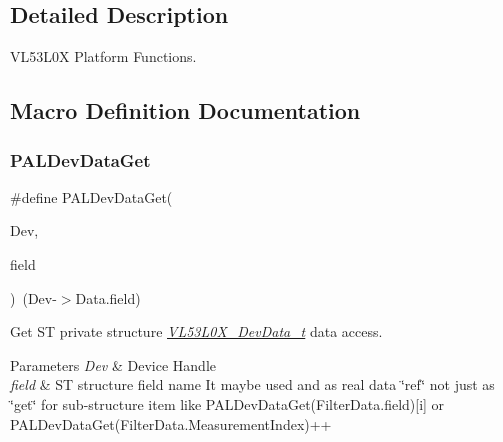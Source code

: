 \subsection{Detailed Description}
V\+L53\+L0X Platform Functions. 



\subsection{Macro Definition Documentation}
\mbox{\label{group__VL53L0X__platform__group_ga21f3ef1fbe84f5cf77d989c95f21ad0a}} 
\subsubsection{\texorpdfstring{P\+A\+L\+Dev\+Data\+Get}{PALDevDataGet}}
{\footnotesize\ttfamily \#define P\+A\+L\+Dev\+Data\+Get(\begin{DoxyParamCaption}\item[{}]{Dev,  }\item[{}]{field }\end{DoxyParamCaption})~(Dev-\/$>$Data.\+field)}



Get ST private structure {\itshape \hyperlink{structVL53L0X__DevData__t}{V\+L53\+L0\+X\+\_\+\+Dev\+Data\+\_\+t}} data access. 


\begin{DoxyParams}{Parameters}
{\em Dev} & Device Handle \\
\hline
{\em field} & ST structure field name It maybe used and as real data \char`\"{}ref\char`\"{} not just as \char`\"{}get\char`\"{} for sub-\/structure item like P\+A\+L\+Dev\+Data\+Get(Filter\+Data.\+field)\mbox{[}i\mbox{]} or P\+A\+L\+Dev\+Data\+Get(Filter\+Data.\+Measurement\+Index)++ \\
\hline
\end{DoxyParams}
\mbox{\label{group__VL53L0X__platform__group_ga7d67a50d6fbce3ffdb71b4b3f7cbdf39}} 
